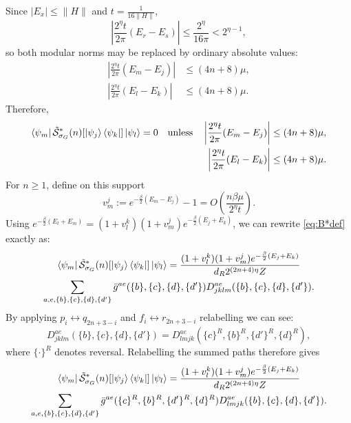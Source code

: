 \documentclass[aps,floatfix,10pt,amssymb,amsfont,amsmath,superscriptaddress,float,nofootinbib,longbibliography,nobalancelastpage,twocolumn]{revtex4-2}
\begin{document}
\begin{widetext}
\begin{equation}
\end{equation}
Since $|E_x|\leq\|H\|$ and $t=\frac{1}{16\|H\|}$,
\begin{equation*}
    \left|\frac{2^{\eta}t}{2\pi}(E_r-E_s)\right|
    \leq \frac{2^{\eta}}{16\pi}<2^{\eta-1},
\end{equation*}
so both modular norms may be replaced by ordinary absolute values:
\begin{equation}
\label{eq:energiessame}
\begin{aligned}
    \left|\frac{2^{\eta}t}{2\pi}(E_m-E_j)\right|&\leq(4n+8)\mu,\\
    \left|\frac{2^{\eta}t}{2\pi}(E_l-E_k)\right|&\leq(4n+8)\mu.
\end{aligned}
\end{equation}
Therefore,
\begin{equation}
\begin{aligned}
    \bra{\psi_m}\tilde{\mathcal{S}}^*_{\sigma_G}(n)[\ket{\psi_j}\bra{\psi_k}]\ket{\psi_l}=0\quad\text{unless}\quad
    \left|\frac{2^{\eta}t}{2\pi}(E_m-E_j)\right|&\leq(4n+8)\mu,\\
    \left|\frac{2^{\eta}t}{2\pi}(E_l-E_k)\right|&\leq(4n+8)\mu.
\end{aligned}
\end{equation}
For $n\geq1$, define on this support
\begin{equation*}
    v_m^j:=e^{-\frac{\beta}{2}(E_m-E_j)}-1=O(\frac{n\beta \mu}{2^{\eta}t}).
\end{equation*}
Using $e^{-\frac{\beta}{2}(E_l+E_m)}=(1+v_l^k)(1+v_m^j)e^{-\frac{\beta}{2}(E_j+E_k)}$, we can rewrite \eqref{eq:B*def} exactly as:
\begin{multline}
     \bra{\psi_m}\tilde{\mathcal{S}}^*_{\sigma_G}(n)[\ket{\psi_j}\bra{\psi_k}]\ket{\psi_l} = \frac{(1+v_l^k)(1+v_m^j)e^{-\frac{\beta}{2}(E_j+E_k)}}{d_R2^{(2n+4)\eta}Z}\\\sum_{a,e,\{b\},\{c\},\{d\},\{d'\}} \bar g^{ae}(\{b\},\{c\},\{d\},\{d'\}) D^{ae}_{jklm}(\{b\},\{c\},\{d\},\{d'\}).
\end{multline}
By applying $p_i \leftrightarrow q_{2n+3-i}$ and $f_i \leftrightarrow r_{2n+3-i}$ relabelling we can see:
\begin{equation*}
    D^{ae}_{jklm}(\{b\},\{c\},\{d\},\{d'\})
    =D^{ae}_{lmjk}(\{c\}^R,\{b\}^R,\{d'\}^R,\{d\}^R),
\end{equation*}
where $\{\cdot\}^R$ denotes reversal.
Relabelling the summed paths therefore gives
\begin{multline}
     \bra{\psi_m}\tilde{\mathcal{S}}^*_{\sigma_G}(n)[\ket{\psi_j}\bra{\psi_k}]\ket{\psi_l} = \frac{(1+v_l^k)(1+v_m^j)e^{-\frac{\beta}{2}(E_j+E_k)}}{d_R2^{(2n+4)\eta}Z}\\\sum_{a,e,\{b\},\{c\},\{d\},\{d'\}} \bar g^{ae}(\{c\}^R,\{b\}^R,\{d'\}^R,\{d\}^R) D^{ae}_{lmjk}(\{b\},\{c\},\{d\},\{d'\}).

\end{multline}
\end{widetext}
\end{document}
